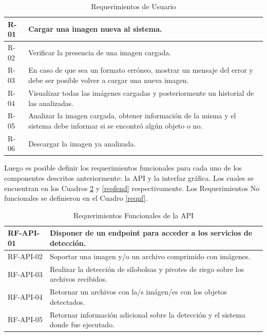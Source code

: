 \begin{table}[h!]
    \begin{tabular}{ | p{1cm} |p{11cm}| }
        \hline
        \rowcolor[HTML]{d6d8ff}
        R-01 & Cargar una imagen nueva al sistema.\\
        \hline
        R-02 & Verificar la presencia de una imagen cargada.\\
        \hline
        \rowcolor[HTML]{d6d8ff}
        R-03 & En caso de que sea un formato erróneo, mostrar un mensaje del error y debe ser posible volver a cargar una nueva imagen.\\
        \hline
        R-04 & Visualizar todas las imágenes cargadas y posteriormente un historial de las analizadas.\\
        \hline
        \rowcolor[HTML]{d6d8ff}
        R-05 & Analizar la imagen cargada, obtener información de la misma y el sistema debe informar si se encontró algún objeto o no.\\
        \hline
        R-06 & Descargar la imagen ya analizada.\\
        \hline
    \end{tabular}
    \caption{Requerimientos de Usuario}
    \label{requser}
\end{table}

\newpage
Luego es posible definir los requerimientos funcionales para cada uno de los componentes descritos anteriormente: la API y la interfaz gráfica. Los cuales se encuentran en los Cuadros \ref{reqapi} y \ref{reqfend} respectivamente. Los Requerimientos No funcionales se definieron en el Cuadro \ref{reqnf}.

\begin{table}[h!]
    \begin{tabular}{ | p{2cm} |p{10cm}| }
        \hline
        \rowcolor[HTML]{d6d8ff}
        RF-API-01 & Disponer de un endpoint para acceder a los servicios de detección.\\
        \hline
        RF-API-02 & Soportar una imagen y/o un archivo comprimido con imágenes.\\
        \hline
        \rowcolor[HTML]{d6d8ff}
         RF-API-03 & Realizar la detección de silobolsas y pivotes de riego sobre los archivos recibidos.\\
        \hline
         RF-API-04 & Retornar un archivos con la/s imágen/es con los objetos detectados.\\
        \hline
        \rowcolor[HTML]{d6d8ff}
         RF-API-05 & Retornar información adicional sobre la detección y el sistema donde fue ejecutado.\\
        \hline
    \end{tabular}\\
    \caption{Requerimientos Funcionales de la API}
    \label{reqapi}
\end{table}

